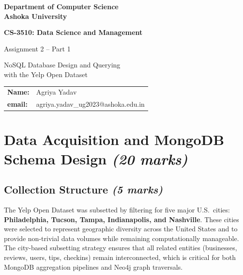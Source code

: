 \documentclass[12pt,a4paper]{article}
\newcommand{\marks}[1]{\hfill\textit{(#1 marks)}}
\begin{document}
\begin{titlepage}
  \centering
  \vspace*{3cm}
  {\Large\bfseries Department of Computer Science\\[0.3em]
  Ashoka University\par}
  \vspace{1.5cm}
  {\LARGE\bfseries CS-3510: Data Science and Management\par}
  \vspace{0.8cm}
  {\Large Assignment 2 -- Part 1\par}
  \vspace{0.5cm}
  {\large NoSQL Database Design and Querying\\with the Yelp Open Dataset\par}
  \vspace{2cm}
  \begin{tabular}{ll}
    \textbf{Name:}        & Agriya Yadav \\[4pt]
    \textbf{email:} & agriya.yadav_ug2023@ashoka.edu.in \\[4pt]
  \end{tabular}
  \vfill
\end{titlepage}

\tableofcontents
\newpage

\section{Data Acquisition and MongoDB Schema Design \marks{20}}

\subsection{Collection Structure \marks{5}}

The Yelp Open Dataset was subsetted by filtering for five major U.S.\ cities:
\textbf{Philadelphia, Tucson, Tampa, Indianapolis, and Nashville}. These cities
were selected to represent geographic diversity across the United States and to
provide non-trivial data volumes while remaining computationally manageable.
The city-based subsetting strategy ensures that all related entities
(businesses, reviews, users, tips, checkins) remain interconnected, which is
critical for both MongoDB aggregation pipelines and Neo4j graph traversals.
\end{document}
